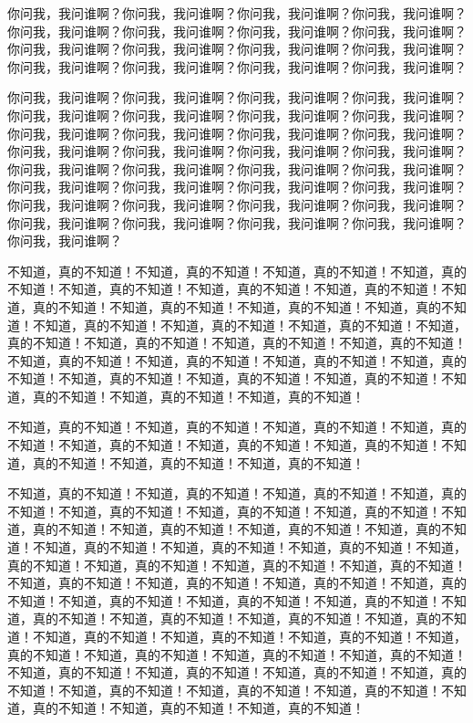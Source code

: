 \documentclass[a4paper,12pt]{book} %
\begin{document}
你问我，我问谁啊？你问我，我问谁啊？你问我，我问谁啊？你问我，我问谁啊？你问我，我问谁啊？你问我，我问谁啊？你问我，我问谁啊？你问我，我问谁啊？你问我，我问谁啊？你问我，我问谁啊？你问我，我问谁啊？你问我，我问谁啊？你问我，我问谁啊？你问我，我问谁啊？你问我，我问谁啊？你问我，我问谁啊？

你问我，我问谁啊？你问我，我问谁啊？你问我，我问谁啊？你问我，我问谁啊？你问我，我问谁啊？你问我，我问谁啊？你问我，我问谁啊？你问我，我问谁啊？你问我，我问谁啊？你问我，我问谁啊？你问我，我问谁啊？你问我，我问谁啊？你问我，我问谁啊？你问我，我问谁啊？你问我，我问谁啊？你问我，我问谁啊？你问我，我问谁啊？你问我，我问谁啊？你问我，我问谁啊？你问我，我问谁啊？你问我，我问谁啊？你问我，我问谁啊？你问我，我问谁啊？你问我，我问谁啊？你问我，我问谁啊？你问我，我问谁啊？你问我，我问谁啊？你问我，我问谁啊？你问我，我问谁啊？你问我，我问谁啊？你问我，我问谁啊？你问我，我问谁啊？你问我，我问谁啊？

不知道，真的不知道！不知道，真的不知道！不知道，真的不知道！不知道，真的不知道！不知道，真的不知道！不知道，真的不知道！不知道，真的不知道！不知道，真的不知道！不知道，真的不知道！不知道，真的不知道！不知道，真的不知道！不知道，真的不知道！不知道，真的不知道！不知道，真的不知道！不知道，真的不知道！不知道，真的不知道！不知道，真的不知道！不知道，真的不知道！不知道，真的不知道！不知道，真的不知道！不知道，真的不知道！不知道，真的不知道！不知道，真的不知道！不知道，真的不知道！不知道，真的不知道！不知道，真的不知道！不知道，真的不知道！不知道，真的不知道！

不知道，真的不知道！不知道，真的不知道！不知道，真的不知道！不知道，真的不知道！不知道，真的不知道！不知道，真的不知道！不知道，真的不知道！不知道，真的不知道！不知道，真的不知道！不知道，真的不知道！

不知道，真的不知道！不知道，真的不知道！不知道，真的不知道！不知道，真的不知道！不知道，真的不知道！不知道，真的不知道！不知道，真的不知道！不知道，真的不知道！不知道，真的不知道！不知道，真的不知道！不知道，真的不知道！不知道，真的不知道！不知道，真的不知道！不知道，真的不知道！不知道，真的不知道！不知道，真的不知道！不知道，真的不知道！不知道，真的不知道！不知道，真的不知道！不知道，真的不知道！不知道，真的不知道！不知道，真的不知道！不知道，真的不知道！不知道，真的不知道！不知道，真的不知道！不知道，真的不知道！不知道，真的不知道！不知道，真的不知道！不知道，真的不知道！不知道，真的不知道！不知道，真的不知道！不知道，真的不知道！不知道，真的不知道！不知道，真的不知道！不知道，真的不知道！不知道，真的不知道！不知道，真的不知道！不知道，真的不知道！不知道，真的不知道！不知道，真的不知道！不知道，真的不知道！不知道，真的不知道！不知道，真的不知道！不知道，真的不知道！不知道，真的不知道！不知道，真的不知道！
\end{document}
